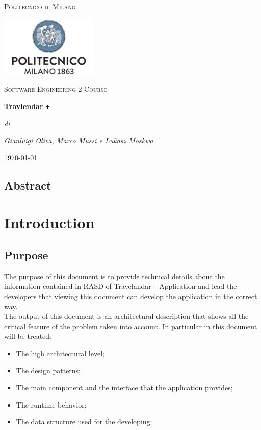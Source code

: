 \documentclass[numbers=noenddot, 12pt, a4paper, oneside]{scrbook}
\def\Plus{\texttt{+}}
\begin{document}
 
\begin{titlepage}
	\centering
	{\scshape\LARGE Politecnico di Milano \par}
	\vspace{1cm}
	\includegraphics[width=0.35\textwidth]{polimi-logo}\par
	\vspace{1cm}
		
	{\scshape\Large Software Engineering 2 Course\par}
	\vspace{1.5cm}
	{\huge\bfseries Travlendar \Plus \par}
	\vspace{6cm}
	{\Large\itshape di\par}
	{\Large\itshape Gianluigi Oliva, Marco Mussi e Lukasz Moskwa\par}
	\vfill

	
	\vfill
	
	{\large \today\par}
\end{titlepage}

\newpage 
\tableofcontents
\newpage 

\section*{Abstract}


\chapter{Introduction}



\section{Purpose}

The purpose of this document is to provide technical details about the information contained in
RASD of Travelandar+ Application and lead the developers that viewing this document can develop the application in the correct way.\\

The output of this document is an architectural description that shows all the critical feature of the
problem taken into account.
In particular in this document will be treated:
\begin{itemize}
	\item The high architectural level;
	\item The design patterns;
	\item The main component and the interface that the application provides;
	\item The runtime behavior;
	\item The data structure used for the developing;
\end{itemize}
\end{document}
